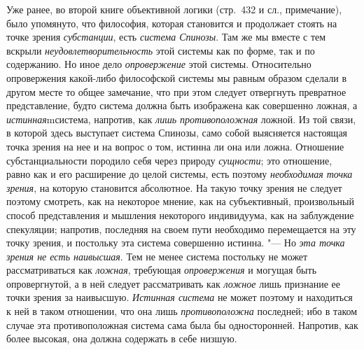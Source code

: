 {Уже ранее, во второй книге объективной логики (стр.~432 и сл., примечание),
было упомянуто, что философия, которая становится и продолжает стоять на
точке зрения {\em субстанции}, есть {\em система Спинозы}. Там же мы вместе
с тем вскрыли {\em неудовлетворительность} этой системы как по форме, так и
по содержанию. Но иное дело {\em опровержение} этой системы. Относительно
опровержения какой-либо философской системы мы равным образом сделали в
другом месте то общее замечание, что при этом следует отвергнуть превратное
представление, будто система должна быть изображена как совершенно ложная,
а {\em истинная}mсистема, напротив, как {\em лишь противоположная} ложной.
Из той связи, в которой здесь выступает система Спинозы, само собой
выясняется настоящая точка зрения на нее и на вопрос о том, истинна ли она
или ложна. Отношение субстанциальности породило себя через природу
{\em сущности}; это отношение, равно как и его расширение до целой системы,
есть поэтому {\em необходимая точка зрения}, на которую становится
абсолютное. На такую точку зрения не следует поэтому смотреть, как на
некоторое мнение, как на субъективный, произвольный способ представления и
мышления некоторого индивидуума, как на заблуждение спекуляции; напротив,
последняя на своем пути необходимо перемещается на эту точку зрения, и
постольку эта система совершенно истинна. "--- Но {\em эта точка зрения не есть
наивысшая}. Тем не менее система постольку не может рассматриваться как
{\em ложная}, требующая {\em опровержения} и могущая быть опровергнутой, а в
ней следует рассматривать как {\em ложное} лишь признание ее точки зрения за
наивысшую. {\em Истинная система} не может поэтому и находиться к ней в
таком отношении, что она лишь {\em противоположна} последней; ибо в таком
случае эта противоположная система сама была бы односторонней. Напротив, как
более высокая, она должна содержать в себе низшую.

}
